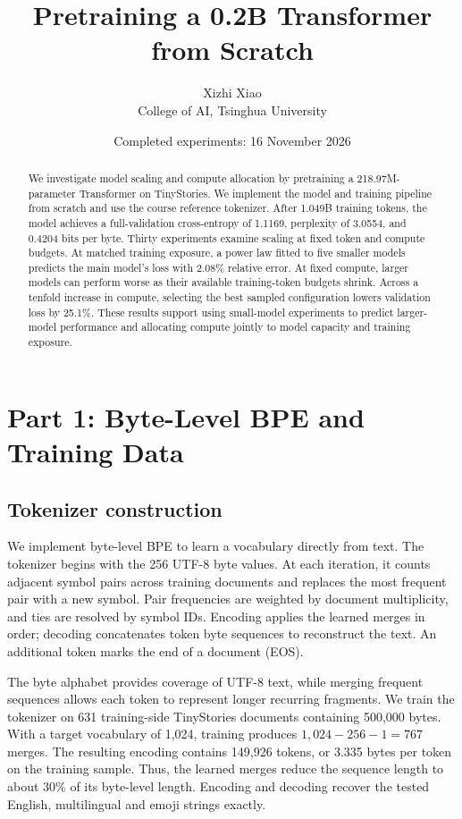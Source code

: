 \documentclass{article}
\title{Pretraining a 0.2B Transformer from Scratch}
\author{Xizhi Xiao\\[4pt]College of AI, Tsinghua University}
\date{Completed experiments: 16 November 2026}
\begin{document}
\maketitle
\begin{abstract}
We investigate model scaling and compute allocation by pretraining a 218.97M-parameter Transformer on TinyStories. We implement the model and training pipeline from scratch and use the course reference tokenizer. After 1.049B training tokens, the model achieves a full-validation cross-entropy of 1.1169, perplexity of 3.0554, and 0.4204 bits per byte. Thirty experiments examine scaling at fixed token and compute budgets. At matched training exposure, a power law fitted to five smaller models predicts the main model's loss with 2.08\% relative error. At fixed compute, larger models can perform worse as their available training-token budgets shrink. Across a tenfold increase in compute, selecting the best sampled configuration lowers validation loss by 25.1\%. These results support using small-model experiments to predict larger-model performance and allocating compute jointly to model capacity and training exposure.
\end{abstract}

\section{Part 1: Byte-Level BPE and Training Data}
\subsection{Tokenizer construction}
We implement byte-level BPE to learn a vocabulary directly from text. The tokenizer begins with the 256 UTF-8 byte values. At each iteration, it counts adjacent symbol pairs across training documents and replaces the most frequent pair with a new symbol. Pair frequencies are weighted by document multiplicity, and ties are resolved by symbol IDs. Encoding applies the learned merges in order; decoding concatenates token byte sequences to reconstruct the text. An additional token marks the end of a document (EOS).

The byte alphabet provides coverage of UTF-8 text, while merging frequent sequences allows each token to represent longer recurring fragments. We train the tokenizer on 631 training-side TinyStories documents containing 500,000 bytes. With a target vocabulary of 1,024, training produces $1,024-256-1=767$ merges. The resulting encoding contains 149,926 tokens, or 3.335 bytes per token on the training sample. Thus, the learned merges reduce the sequence length to about 30\% of its byte-level length. Encoding and decoding recover the tested English, multilingual and emoji strings exactly.
\end{document}
